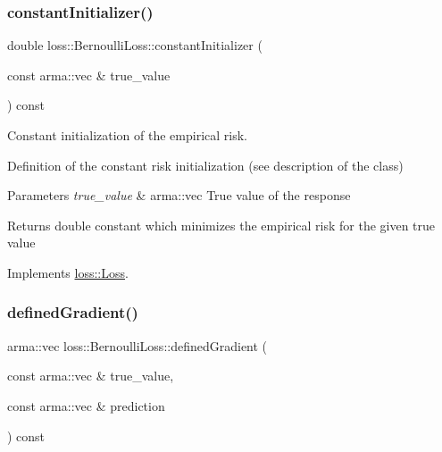 \subsubsection{\texorpdfstring{constant\+Initializer()}{constantInitializer()}}
{\footnotesize\ttfamily double loss\+::\+Bernoulli\+Loss\+::constant\+Initializer (\begin{DoxyParamCaption}\item[{const arma\+::vec \&}]{true\+\_\+value }\end{DoxyParamCaption}) const\hspace{0.3cm}{\ttfamily [virtual]}}



Constant initialization of the empirical risk. 

Definition of the constant risk initialization (see description of the class)


\begin{DoxyParams}{Parameters}
{\em true\+\_\+value} & {\ttfamily arma\+::vec} True value of the response\\
\hline
\end{DoxyParams}
\begin{DoxyReturn}{Returns}
{\ttfamily double} constant which minimizes the empirical risk for the given true value 
\end{DoxyReturn}


Implements \mbox{\hyperlink{classloss_1_1_loss_a65fe7dcd9370e6a549b8d1cc95fc8798}{loss\+::\+Loss}}.

\mbox{\label{classloss_1_1_bernoulli_loss_a2dc644172cea3eb84f1af5aa9217c04a}} 
\subsubsection{\texorpdfstring{defined\+Gradient()}{definedGradient()}}
{\footnotesize\ttfamily arma\+::vec loss\+::\+Bernoulli\+Loss\+::defined\+Gradient (\begin{DoxyParamCaption}\item[{const arma\+::vec \&}]{true\+\_\+value,  }\item[{const arma\+::vec \&}]{prediction }\end{DoxyParamCaption}) const\hspace{0.3cm}{\ttfamily [virtual]}}




